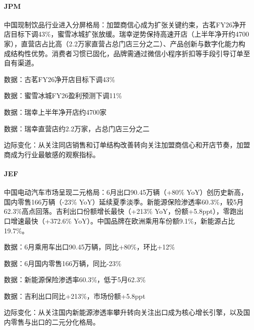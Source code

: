\documentclass[11pt]{ctexart}
\begin{document}
\paragraph{JPM} 中国现制饮品行业进入分屏格局：加盟商信心成为扩张关键约束，古茗FY26净开店目标下调43\%，蜜雪冰城扩张放缓。瑞幸逆势保持高速开店（上半年净开约4700家），直营店占比高（2.2万家直营占总门店三分之二）、产品创新与数字化能力构成结构性优势。消费者习惯已固化，品牌需通过微信小程序折扣等手段引导订单至自有渠道。
{\small\color{refgray}数据：古茗FY26净开店目标下调43\%\par}
{\small\color{refgray}数据：蜜雪冰城FY26盈利预测下调11\%\par}
{\small\color{refgray}数据：瑞幸上半年净开店约4700家\par}
{\small\color{refgray}数据：瑞幸直营店约2.2万家，占总门店三分之二\par}
{\small\color{refgray}边际变化：从关注同店销售和订单结构改善转向关注加盟商信心和开店节奏，加盟商成为行业最敏感的观察指标。\par}
\paragraph{JEF} 中国电动汽车市场呈现二元格局：6月出口90.45万辆（+80\% YoY）创历史新高，国内零售166万辆（-23\% YoY）延续夏季淡季。新能源保险渗透率60.3\%，较5月62.3\%高点回落。吉利出口份额增长最快（+213\% YoY，份额+5.8ppt），零跑出口增速最快（+372.6\% YoY）。中国品牌在欧洲乘用车份额9.1\%，新能源占比19.7\%。
{\small\color{refgray}数据：6月乘用车出口90.45万辆，同比+80\%，环比+12\%\par}
{\small\color{refgray}数据：6月国内零售166万辆，同比-23\%\par}
{\small\color{refgray}数据：新能源保险渗透率60.3\%，低于5月62.3\%\par}
{\small\color{refgray}数据：吉利出口同比+213\%，市场份额+5.8ppt\par}
{\small\color{refgray}边际变化：从关注国内新能源渗透率攀升转向关注出口成为核心增长引擎，以及国内零售与出口的二元分化格局。\par}
\end{document}
